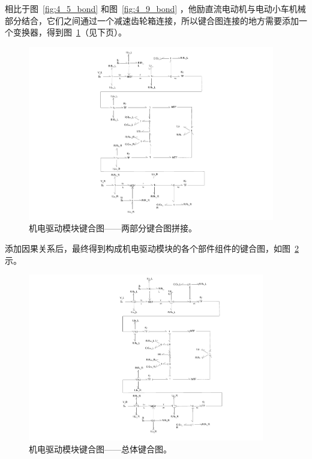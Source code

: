 相比于图~\ref{fig:4_5_bond} 和图~\ref{fig:4_9_bond} ，他励直流电动机与电动小车机械部分结合，它们之间通过一个减速齿轮箱连接，所以键合图连接的地方需要添加一个变换器，得到图~\ref{fig:4_10_bond}（见下页）。

\begin{figure}[!t]
	\centering
	\includegraphics[width=0.96\textwidth]{fig/4_10_bond.pdf}
	\caption{机电驱动模块键合图——两部分键合图拼接。}\label{fig:4_10_bond}
\end{figure}

\clearpage

添加因果关系后，最终得到构成机电驱动模块的各个部件组件的键合图，如图~\ref{fig:part2_bond} 示。

\begin{figure}[!h]
	\centering
	\includegraphics[width=0.92\textwidth]{fig/part2_bond.pdf}
	\caption{机电驱动模块键合图——总体键合图。}\label{fig:part2_bond}
\end{figure}
